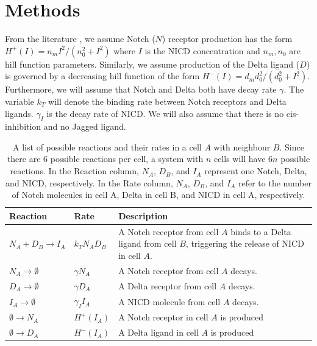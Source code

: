 \documentclass{article}
\begin{document}
\section*{Methods}

From the literature \cite{collier_pattern_1996, boareto_jaggeddelta_2015}, we assume Notch ($N$) receptor production has the form $H^{+}(I) = n_{m}I^2/(n_{0}^2 + I^2)$ where $I$ is the NICD concentration and $n_{m}, n_{0}$ are hill function parameters.
Similarly, we assume production of the Delta ligand ($D$) is governed by a decreasing hill function of the form $H^{-}(I) = d_{m}d_{0}^2/(d_{0}^2 + I^2)$.
Furthermore, we will assume that Notch and Delta both have decay rate $\gamma$.
The variable $k_{T}$ will denote the binding rate between Notch receptors and Delta ligands.
$\gamma_{I}$ is the decay rate of NICD.
We will also assume that there is no cis-inhibition and no Jagged ligand. 

\begin{table}[!htp]
\centering
\begin{tabular}{|m{8em}|m{5em}|m{20em}|} 
 \hline
 Reaction & Rate & Description \\ 
 \hline
 $N_{A} + D_{B} \rightarrow I_{A}$ & 
 $k_{T} N_{A}D_{B}$ &
 A Notch receptor from cell $A$ binds to a Delta ligand from cell $B$, triggering the release of NICD in cell $A$. \\
 \hline
 $N_{A} \rightarrow \emptyset$ & 
 $\gamma N_{A}$ & 
 A Notch receptor from cell $A$ decays. \\
 \hline
 $D_{A} \rightarrow \emptyset$ & 
 $\gamma D_{A}$ & 
 A Delta receptor from cell $A$ decays. \\
 \hline
 $I_{A} \rightarrow \emptyset$ &
 $\gamma_{I} I_{A}$ &
 A NICD molecule from cell $A$ decays.  \\
 \hline
 $\emptyset \rightarrow N_{A}$ & 
 $H^{+}(I_{A})$ &
 A Notch receptor in cell $A$ is produced \\
 \hline
 $\emptyset \rightarrow D_{A}$ &
 $H^{-}(I_{A})$ &
 A Delta ligand in cell $A$ is produced \\
 \hline
\end{tabular}
\caption{
  A list of possible reactions and their rates in a cell $A$ with neighbour $B$.
  Since there are $6$ possible reactions per cell, a system with $n$ cells will have $6n$ possible reactions.
  In the Reaction column, $N_A$, $D_B$, and $I_A$ represent one Notch, Delta, and NICD, respectively. In the Rate column, $N_A$, $D_B$, and $I_A$ refer to the number of Notch molecules in cell A, Delta in cell B, and NICD in cell A, respectively.
}
\label{tb:reactions}
\end{table}
\end{document}
